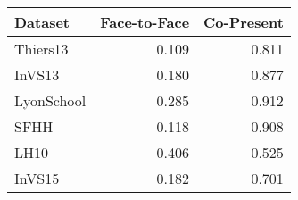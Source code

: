 \begin{tabular}{lrr}
\hline
 Dataset    &   Face-to-Face &   Co-Present \\
\hline
 Thiers13   &          0.109 &        0.811 \\
 InVS13     &          0.180 &        0.877 \\
 LyonSchool &          0.285 &        0.912 \\
 SFHH       &          0.118 &        0.908 \\
 LH10       &          0.406 &        0.525 \\
 InVS15     &          0.182 &        0.701 \\
\hline
\end{tabular}
